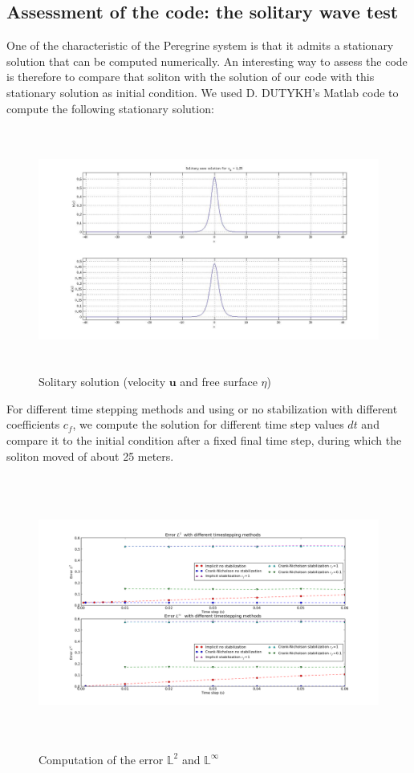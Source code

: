 \documentclass[11pt,a4paper]{article}
\begin{document}
\subsection{Assessment of the code: the solitary wave test}	
	One of the characteristic of the Peregrine system is that it admits a stationary solution that can be computed numerically. An interesting way to assess the code is therefore to compare that soliton with the solution of our code with this stationary solution as initial condition. We used D. DUTYKH's Matlab code to compute the following stationary solution: 
	\begin{figure}[!h]
		\centering
		\includegraphics[height=8cm]{PeregrineSolitonSolution.jpg}
		\caption{Solitary solution (velocity $\mathbf{u}$ and free surface $\eta$)}
	\end{figure}		
			
	For different time stepping methods and using or no stabilization with different coefficients $c_f$, we compute the solution for different time step values $dt$ and compare it to the initial condition after a fixed final time step, during which the soliton moved of about 25 meters. 
	\begin{figure}[!h]
		\centering
		\includegraphics[height=9cm]{ErrorL2L801.png}
		\caption{Computation of the error $\mathbb{L}^2$ and $\mathbb{L}^{\infty}$}
	\end{figure}
	
\end{document}
